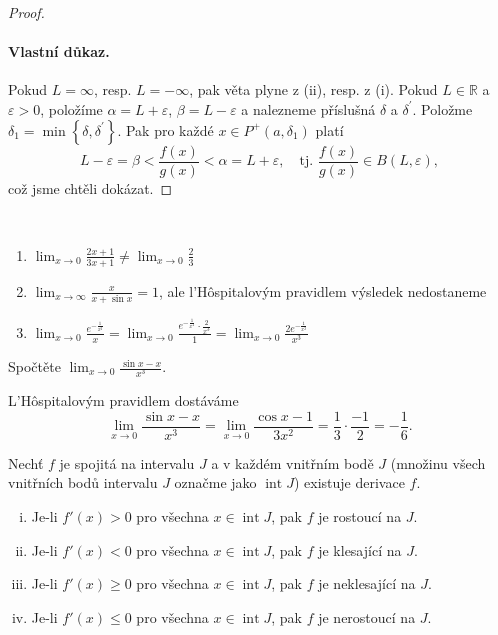 \begin{proof}
	\paragraph{Vlastní důkaz.} Pokud $L= \infty$, resp. $L=-\infty$, pak věta plyne z (ii), resp. z (i).
	Pokud $L\in \mathbb R $ a $\varepsilon > 0$, položíme $\alpha = L+\varepsilon$, $\beta = L-\varepsilon$
	a nalezneme příslušná $\delta$ a $\delta^\prime$. Položme $\delta_1=\min \left \{ \delta, \delta^\prime \right \} $.
	Pak pro každé $x \in P^+(a,\delta_1)$ platí
	$$
	    L-\varepsilon =\beta < \frac{f(x)}{g(x)}<\alpha = L+\varepsilon, \quad \textrm{tj. } \frac{f(x)}{g(x)}\in B(L,\varepsilon),
	$$
	což jsme chtěli dokázat.
\end{proof}

\begin{poznamka}\,
\begin{enumerate}[$i.$]
	\item $\lim_{x\to 0} \frac{2x+1}{3x+1} \ne \lim_{x\to 0} \frac{2}{3}$
	\item $\lim_{x\to \infty} \frac{x}{x+\sin x}=1$, ale l'H\^ospitalovým pravidlem výsledek nedostaneme
	\item $\lim_{x\to 0} \frac{e^{-\frac{1}{x^2}}}{x}= \lim_{x\to 0} \frac{e^{-\frac{1}{x^2}}\cdot \frac{2}{x^3}}{1}=\lim_{x\to 0} \frac{2e^{-\frac{1}{x^2}}}{x^3}$
\end{enumerate}
\end{poznamka}

\begin{priklad}
	Spočtěte $\lim_{x\to 0} \frac{\sin x -x}{x^3}$.
\end{priklad}

\begin{reseni}
	L'H\^ospitalovým pravidlem dostáváme
	$$
	    \lim_{x\to 0} \frac{\sin x -x}{x^3} = \lim_{x\to 0} \frac{\cos x -1}{3x^2} = \frac{1}{3}\cdot \frac{-1}{2} = -\frac{1}{6}.
	$$
\end{reseni}

\begin{veta}\label{veta5.10}
Nechť $f$ je spojitá na intervalu $J$ a v každém vnitřním bodě $J$ (množinu všech vnitřních bodů intervalu $J$ označme jako $\operatorname{int} J$) existuje derivace $f$.
\begin{enumerate}[(i)]
  \item Je-li $f'(x)>0$ pro všechna $x\in\operatorname{int} J$, pak $f$ je rostoucí na $J$.
  \item Je-li $f'(x)<0$ pro všechna $x\in\operatorname{int} J$, pak $f$ je klesající na $J$.
  \item Je-li $f'(x)\ge 0$ pro všechna $x\in\operatorname{int} J$, pak $f$ je neklesající na $J$.
  \item Je-li $f'(x)\le 0$ pro všechna $x\in\operatorname{int} J$, pak $f$ je nerostoucí na $J$.
\end{enumerate}
\end{veta}


